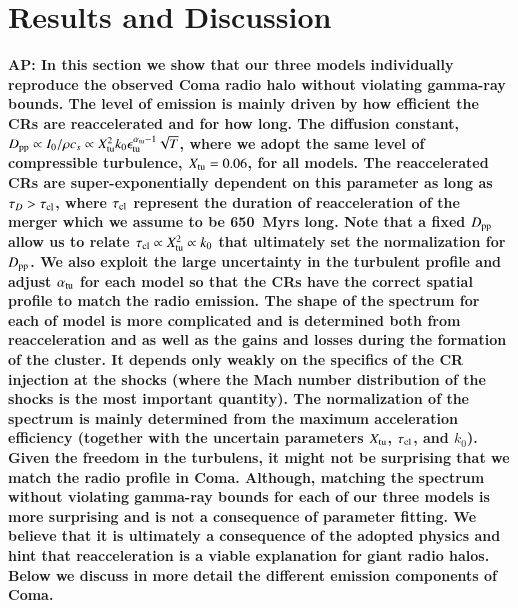 \documentclass[useAMS,usenatbib]{mn2e}
\def\AP#1{{\bf  AP: #1}}
\begin{document}
\section{Results and Discussion} 
\label{sec:results}
\AP{In this section we show that our three models individually
  reproduce the observed Coma radio halo without violating gamma-ray
  bounds. The level of emission is mainly driven by how efficient the
  CRs are reaccelerated and for how long. The diffusion constant,
  $D_{\mathrm{pp}}\propto I_0/\rho c_s \propto
  X_{\mathrm{tu}}^2k_0\epsilon_{\mathrm{tu}}^{\alpha_{\mathrm{tu}}-1}\sqrt{T}$, where
  we adopt the same level of compressible turbulence,
  $X_{\mathrm{tu}}=0.06$, for all models. The reaccelerated CRs are
  super-exponentially dependent on this parameter as long as $\tau_D >
  \tau_{\mathrm{cl}}$, where $\tau_{\mathrm{cl}}$ represent the duration of
  reacceleration of the merger which we assume to be 650~Myrs
  long. Note that a fixed $D_{\mathrm{pp}}$ allow us to relate
  $\tau_{\mathrm{cl}} \propto X_{\mathrm{tu}}^2 \propto k_0$ that ultimately set
  the normalization for $D_{\mathrm{pp}}$. We also exploit the large
  uncertainty in the turbulent profile and adjust $\alpha_{\mathrm{tu}}$
  for each model so that the CRs have the correct spatial profile to
  match the radio emission. The shape of the spectrum for each of
  model is more complicated and is determined both from reacceleration
  and as well as the gains and losses during the formation of the
  cluster. It depends only weakly on the specifics of the CR injection
  at the shocks (where the Mach number distribution of the shocks is
  the most important quantity). The normalization of the spectrum is
  mainly determined from the maximum acceleration efficiency (together
  with the uncertain parameters $X_{\mathrm{tu}}$, $\tau_{\mathrm{cl}}$, and
  $k_0$). Given the freedom in the turbulens, it might not be
  surprising that we match the radio profile in Coma. Although,
  matching the spectrum without violating gamma-ray bounds for each of
  our three models is more surprising and is not a consequence of
  parameter fitting. We believe that it is ultimately a consequence of
  the adopted physics and hint that reacceleration is a viable
  explanation for giant radio halos. Below we discuss in more detail
  the different emission components of Coma.}
\end{document}
